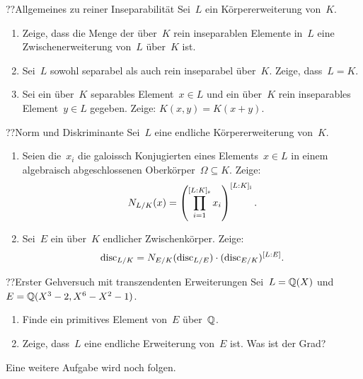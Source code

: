 \documentclass{algblatt}
\begin{document}

\begin{aufgabe}{??}{Allgemeines zu reiner Inseparabilität}
Sei~$L$ ein Körpererweiterung von~$K$.
\begin{enumerate}
\item Zeige, dass die Menge der über~$K$ rein inseparablen Elemente in~$L$ eine
Zwischenerweiterung von~$L$ über~$K$ ist.
\item Sei~$L$ sowohl separabel als auch rein inseparabel über~$K$. Zeige,
dass~$L = K$.
\item Sei ein über~$K$ separables Element~$x \in L$ und ein über~$K$ rein
inseparables Element~$y \in L$ gegeben. Zeige: $K(x,y) = K(x+y)$.
\end{enumerate}
\end{aufgabe}

\begin{aufgabe}{??}{Norm und Diskriminante}
Sei~$L$ eine endliche Körpererweiterung von~$K$.
\begin{enumerate}
\item Seien die~$x_i$ die galoissch Konjugierten eines Elements~$x \in L$ in
einem algebraisch abgeschlossenen Oberkörper~$\Omega \subseteq K$. Zeige:
\[ N_{L/K}(x) = \left(\prod_{i=1}^{[L:K]_\text{s}}
x_i\right)^{[L:K]_\text{i}}. \]
\item Sei~$E$ ein über~$K$ endlicher Zwischenkörper. Zeige:
\[ \mathrm{disc}_{L/K} = N_{E/K}(\mathrm{disc}_{L/E}) \cdot (\mathrm{disc}_{E/K})^{[L:E]}. \]
\end{enumerate}
\end{aufgabe}

\begin{aufgabe}{??}{Erster Gehversuch mit transzendenten Erweiterungen}
Sei~$L = \mathbb{Q}(X)$ und~$E = \mathbb{Q}(X^3 - 2, X^6 - X^2 - 1)$.
\begin{enumerate}
\item Finde ein primitives Element von~$E$ über~$\mathbb{Q}$.
\item Zeige, dass~$L$ eine endliche Erweiterung von~$E$ ist. Was ist der Grad?
\end{enumerate}
\end{aufgabe}

Eine weitere Aufgabe wird noch folgen.
\end{document}
